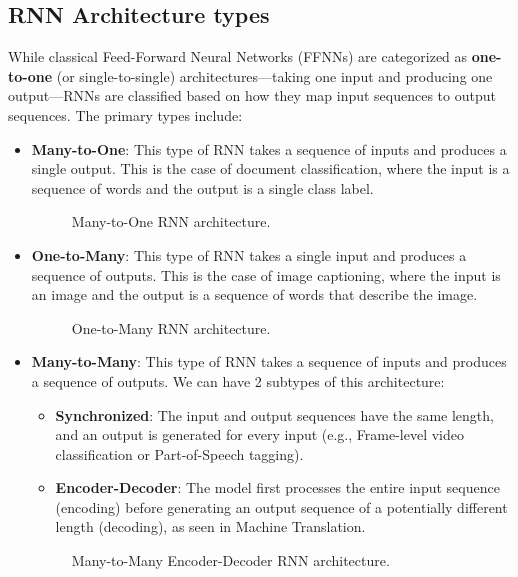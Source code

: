 \subsection{RNN Architecture types}
While classical Feed-Forward Neural Networks (FFNNs) are categorized as \textbf{one-to-one} (or single-to-single) 
architectures—taking one input and producing one output—RNNs are classified based on how they map input sequences to output sequences.
The primary types include:
\begin{itemize}
    \item \textbf{Many-to-One}: This type of RNN takes a sequence of inputs and produces a single output.
    This is the case of document classification, where the input is a sequence of words and the output is a single class label.
    \begin{figure}[H]
        \centering
        
        \caption{Many-to-One RNN architecture.}
    \end{figure}

    \item \textbf{One-to-Many}: This type of RNN takes a single input and produces a sequence of outputs.
    This is the case of image captioning, where the input is an image and the output is a sequence of words that describe the image.
    \begin{figure}[H]
        \centering
        
        \caption{One-to-Many RNN architecture.}
    \end{figure}
    \item \textbf{Many-to-Many}: This type of RNN takes a sequence of inputs and produces a sequence of outputs.
    We can have 2 subtypes of this architecture:
    \begin{itemize}
        \item \textbf{Synchronized}: The input and output sequences have the same length, and an output is generated for every input 
        (e.g., Frame-level video classification or Part-of-Speech tagging).
        \item \textbf{Encoder-Decoder}: The model first processes the entire input sequence (encoding) before generating an output sequence of a potentially different length (decoding), 
        as seen in Machine Translation.
    \end{itemize}
    \begin{figure}[H]
        \centering
        \begin{minipage}{0.45\textwidth}
            \centering
            
            \caption{Many-to-Many Synchronized RNN architecture.}
        \end{minipage}
        \hfill
        \begin{minipage}{0.45\textwidth}
            \centering
            
            \caption{Many-to-Many Encoder-Decoder RNN architecture.}
        \end{minipage}
    \end{figure}
\end{itemize}

